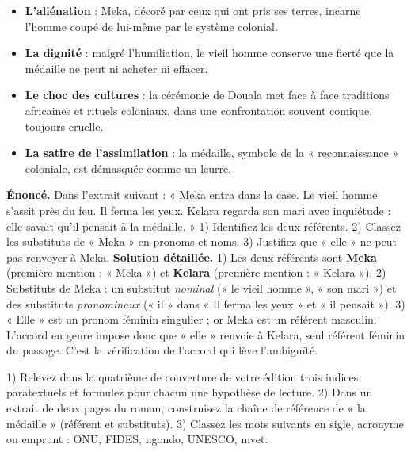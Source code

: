 \documentclass[11pt]{article}
\begin{document}
\begin{exemplebox}
\begin{itemize}
\item \textbf{L'aliénation} : Meka, décoré par ceux qui ont pris ses terres, incarne l'homme coupé de lui-même par le système colonial.
\item \textbf{La dignité} : malgré l'humiliation, le vieil homme conserve une fierté que la médaille ne peut ni acheter ni effacer.
\item \textbf{Le choc des cultures} : la cérémonie de Douala met face à face traditions africaines et rituels coloniaux, dans une confrontation souvent comique, toujours cruelle.
\item \textbf{La satire de l'assimilation} : la médaille, symbole de la « reconnaissance » coloniale, est démasquée comme un leurre.
\end{itemize}
\end{exemplebox}

\begin{exoresolu}
\textbf{Énoncé.} Dans l'extrait suivant : « Meka entra dans la case. Le vieil homme s'assit près du feu. Il ferma les yeux. Kelara regarda son mari avec inquiétude : elle savait qu'il pensait à la médaille. » 1) Identifiez les deux référents. 2) Classez les substituts de « Meka » en pronoms et noms. 3) Justifiez que « elle » ne peut pas renvoyer à Meka.
\tcblower
\textbf{Solution détaillée.} 1) Les deux référents sont \textbf{Meka} (première mention : « Meka ») et \textbf{Kelara} (première mention : « Kelara »). 2) Substituts de Meka : un substitut \emph{nominal} (« le vieil homme », « son mari ») et des substituts \emph{pronominaux} (« il » dans « Il ferma les yeux » et « il pensait »). 3) « Elle » est un pronom féminin singulier ; or Meka est un référent masculin. L'accord en genre impose donc que « elle » renvoie à Kelara, seul référent féminin du passage. C'est la vérification de l'accord qui lève l'ambiguïté.
\end{exoresolu}

\begin{exercice}
1) Relevez dans la quatrième de couverture de votre édition trois indices paratextuels et formulez pour chacun une hypothèse de lecture. 2) Dans un extrait de deux pages du roman, construisez la chaîne de référence de « la médaille » (référent et substituts). 3) Classez les mots suivants en sigle, acronyme ou emprunt : ONU, FIDES, ngondo, UNESCO, mvet.
\end{exercice}
\end{document}
